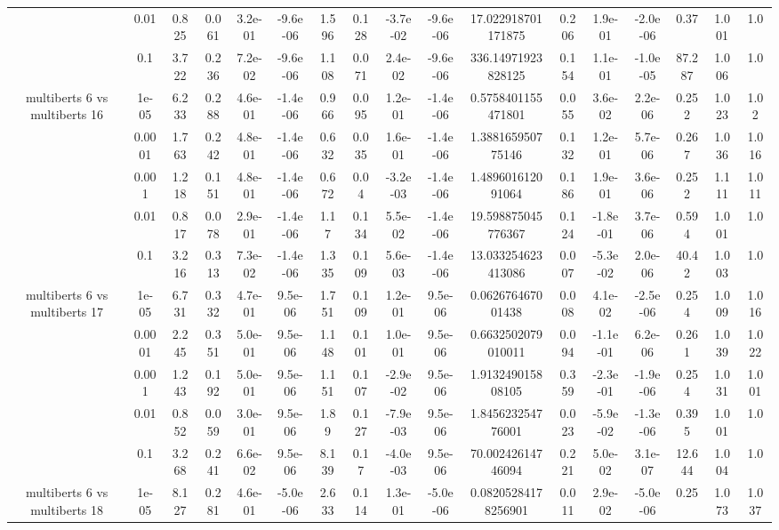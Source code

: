 \begin{tabular}{|c|c|c|c|c|c|c|c|c|c|c|c|c|c|c|c|c|}
 & 0.01 & 0.825 & 0.061 & 3.2e-01 & -9.6e-06 & 1.596 & 0.128 & -3.7e-02 & -9.6e-06 & 17.022918701171875 & 0.206 & 1.9e-01 & -2.0e-06 & 0.37 & 1.001 & 1.0 \\
 & 0.1 & 3.722 & 0.236 & 7.2e-02 & -9.6e-06 & 1.108 & 0.071 & 2.4e-02 & -9.6e-06 & 336.14971923828125 & 0.154 & 1.1e-01 & -1.0e-05 & 87.287 & 1.006 & 1.0 \\
\hline
\multirow{5}{*}{multiberts 6 vs multiberts 16} & 1e-05 & 6.233 & 0.288 & 4.6e-01 & -1.4e-06 & 0.966 & 0.095 & 1.2e-01 & -1.4e-06 & 0.5758401155471801 & 0.055 & 3.6e-02 & 2.2e-06 & 0.252 & 1.023 & 1.02 \\
 & 0.0001 & 1.763 & 0.242 & 4.8e-01 & -1.4e-06 & 0.632 & 0.035 & 1.6e-01 & -1.4e-06 & 1.388165950775146 & 0.132 & 1.2e-01 & 5.7e-06 & 0.267 & 1.036 & 1.016 \\
 & 0.001 & 1.218 & 0.151 & 4.8e-01 & -1.4e-06 & 0.672 & 0.04 & -3.2e-03 & -1.4e-06 & 1.489601612091064 & 0.186 & 1.9e-01 & 3.6e-06 & 0.252 & 1.111 & 1.011 \\
 & 0.01 & 0.817 & 0.078 & 2.9e-01 & -1.4e-06 & 1.17 & 0.134 & 5.5e-02 & -1.4e-06 & 19.598875045776367 & 0.124 & -1.8e-01 & 3.7e-06 & 0.594 & 1.001 & 1.0 \\
 & 0.1 & 3.216 & 0.313 & 7.3e-02 & -1.4e-06 & 1.335 & 0.109 & 5.6e-03 & -1.4e-06 & 13.033254623413086 & 0.007 & -5.3e-02 & 2.0e-06 & 40.42 & 1.003 & 1.0 \\
\hline
\multirow{5}{*}{multiberts 6 vs multiberts 17} & 1e-05 & 6.731 & 0.332 & 4.7e-01 & 9.5e-06 & 1.751 & 0.109 & 1.2e-01 & 9.5e-06 & 0.062676467001438 & 0.008 & 4.1e-02 & -2.5e-06 & 0.254 & 1.009 & 1.016 \\
 & 0.0001 & 2.245 & 0.351 & 5.0e-01 & 9.5e-06 & 1.148 & 0.101 & 1.0e-01 & 9.5e-06 & 0.6632502079010011 & 0.094 & -1.1e-01 & 6.2e-06 & 0.261 & 1.039 & 1.022 \\
 & 0.001 & 1.243 & 0.192 & 5.0e-01 & 9.5e-06 & 1.151 & 0.107 & -2.9e-02 & 9.5e-06 & 1.913249015808105 & 0.359 & -2.3e-01 & -1.9e-06 & 0.254 & 1.031 & 1.001 \\
 & 0.01 & 0.852 & 0.059 & 3.0e-01 & 9.5e-06 & 1.89 & 0.127 & -7.9e-03 & 9.5e-06 & 1.845623254776001 & 0.023 & -5.9e-02 & -1.3e-06 & 0.395 & 1.001 & 1.0 \\
 & 0.1 & 3.268 & 0.241 & 6.6e-02 & 9.5e-06 & 8.139 & 0.17 & -4.0e-03 & 9.5e-06 & 70.00242614746094 & 0.221 & 5.0e-02 & 3.1e-07 & 12.644 & 1.004 & 1.0 \\
\hline
\multirow{5}{*}{multiberts 6 vs multiberts 18} & 1e-05 & 8.127 & 0.281 & 4.6e-01 & -5.0e-06 & 2.633 & 0.114 & 1.3e-01 & -5.0e-06 & 0.08205284178256901 & 0.011 & 2.9e-02 & -5.0e-06 & 0.25 & 1.073 & 1.037 \\

\end{tabular}
